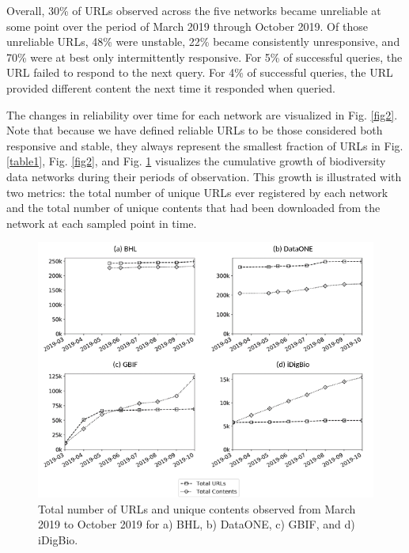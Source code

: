 \documentclass[10pt,letterpaper]{article}
\begin{document}
Overall, 30\% of URLs observed across the five networks became unreliable at some point over the period of March 2019 through October 2019. Of those unreliable URLs, 48\% were unstable, 22\% became consistently unresponsive, and 70\% were at best only intermittently responsive. For 5\% of successful queries, the URL failed to respond to the next query. For 4\% of successful queries, the URL provided different content the next time it responded when queried.

The changes in reliability over time for each network are visualized in Fig. \ref{fig2}. Note that because we have defined reliable URLs to be those considered both responsive and stable, they always represent the smallest fraction of URLs in Fig. \ref{table1}, Fig. \ref{fig2}, and Fig. \ref{fig3} visualizes the cumulative growth of biodiversity data networks during their periods of observation. This growth is illustrated with two metrics: the total number of unique URLs ever registered by each network and the total number of unique contents that had been downloaded from the network at each sampled point in time.


\begin{figure}[ht] %


\includegraphics[width=\textwidth]{fig3.png}

\caption{
Total number of URLs and unique contents observed from March 2019 to October 2019 for a) BHL, b) DataONE, c) GBIF, and d) iDigBio.
}

\label{fig3} %

\end{figure}
\end{document}
